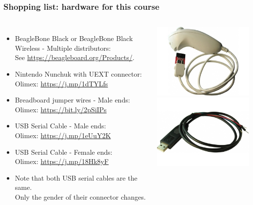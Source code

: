 \begin{frame}
\frametitle{Shopping list: hardware for this course}
  \begin{columns}
    \footnotesize
    \begin{itemize}
      \item BeagleBone Black or BeagleBone Black Wireless - Multiple distributors: \\
	    See \url{https://beagleboard.org/Products/}.
      \item Nintendo Nunchuk with UEXT connector: \\
            Olimex: \url{https://j.mp/1dTYLfs}
      \item Breadboard jumper wires - Male ends: \\
	    Olimex: \url{https://bit.ly/2pSiIPs}
      \item USB Serial Cable - Male ends: \\
	    Olimex: \url{https://j.mp/1eUuY2K}
      \item USB Serial Cable - Female ends: \\
	    Olimex: \url{https://j.mp/18Hk8yF}
      \item Note that both USB serial cables are the same.\\
            Only the gender of their connector changes.
    \end{itemize}
    \includegraphics[height=0.25\textheight]{slides/kernel-shopping-list/nunchuk.jpg} \\
    \includegraphics[height=0.20\textheight]{slides/kernel-shopping-list/usb-serial-cable-male.jpg} \\

\end{columns}
\end{frame}
